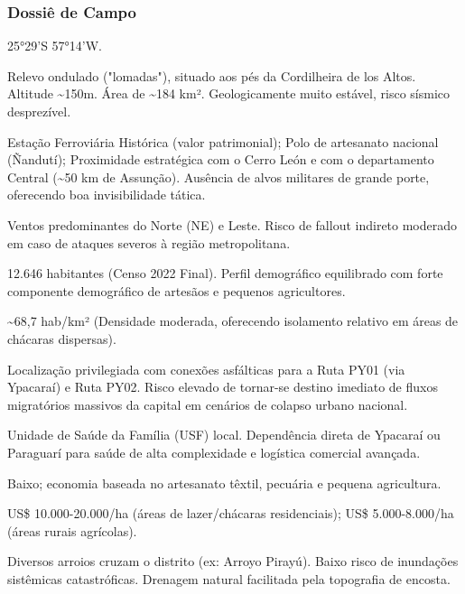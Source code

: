 \subsubsection{Dossiê de Campo}
\begin{description}[style=nextline,leftmargin=0.5cm,font=\bfseries]
\item[Coordenadas]  25°29'S 57°14'W.
\item[Topografia]  Relevo ondulado ("lomadas"), situado aos pés da Cordilheira de los Altos. Altitude \textasciitilde 150m. Área de \textasciitilde 184 km². Geologicamente muito estável, risco sísmico desprezível.
\item[Alvos Estratégicos]  Estação Ferroviária Histórica (valor patrimonial); Polo de artesanato nacional (Ñandutí); Proximidade estratégica com o Cerro León e com o departamento Central (\textasciitilde 50 km de Assunção). Ausência de alvos militares de grande porte, oferecendo boa invisibilidade tática.
\item[Fallout]  Ventos predominantes do Norte (NE) e Leste. Risco de fallout indireto moderado em caso de ataques severos à região metropolitana.
\item[População]  12.646 habitantes (Censo 2022 Final). Perfil demográfico equilibrado com forte componente demográfico de artesãos e pequenos agricultores.
\item[Densidade]  \textasciitilde 68,7 hab/\allowbreak km² (Densidade moderada, oferecendo isolamento relativo em áreas de chácaras dispersas).
\item[Vias de Acesso]  Localização privilegiada com conexões asfálticas para a Ruta PY01 (via Ypacaraí) e Ruta PY02. Risco elevado de tornar-se destino imediato de fluxos migratórios massivos da capital em cenários de colapso urbano nacional.
\item[Serviços]  Unidade de Saúde da Família (USF) local. Dependência direta de Ypacaraí ou Paraguarí para saúde de alta complexidade e logística comercial avançada.
\item[Custo de Vida]  Baixo; economia baseada no artesanato têxtil, pecuária e pequena agricultura.
\item[Preço da Terra]  US\$ 10.000-20.000/\allowbreak ha (áreas de lazer/\allowbreak chácaras residenciais); US\$ 5.000-8.000/\allowbreak ha (áreas rurais agrícolas).
\item[Hidrologia]  Diversos arroios cruzam o distrito (ex: Arroyo Pirayú). Baixo risco de inundações sistêmicas catastróficas. Drenagem natural facilitada pela topografia de encosta.

\end{description}
